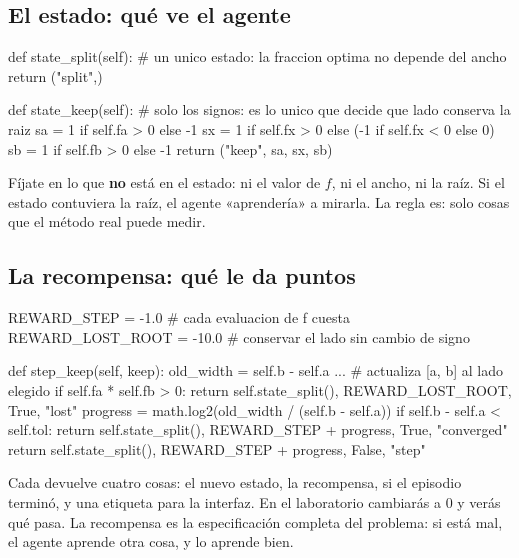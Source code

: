 \subsection*{El estado: qué ve el agente}
\begin{python}
def state_split(self):
    # un unico estado: la fraccion optima no depende del ancho
    return ("split",)

def state_keep(self):
    # solo los signos: es lo unico que decide que lado conserva la raiz
    sa = 1 if self.fa > 0 else -1
    sx = 1 if self.fx > 0 else (-1 if self.fx < 0 else 0)
    sb = 1 if self.fb > 0 else -1
    return ("keep", sa, sx, sb)
\end{python}
Fíjate en lo que \textbf{no} está en el estado: ni el valor de $f$, ni el ancho, ni la raíz. Si el estado contuviera la raíz, el agente «aprendería» a mirarla. La regla es: solo cosas que el método real puede medir.

\subsection*{La recompensa: qué le da puntos}
\begin{python}
REWARD_STEP = -1.0        # cada evaluacion de f cuesta
REWARD_LOST_ROOT = -10.0  # conservar el lado sin cambio de signo

def step_keep(self, keep):
    old_width = self.b - self.a
    ...  # actualiza [a, b] al lado elegido
    if self.fa * self.fb > 0:
        return self.state_split(), REWARD_LOST_ROOT, True, "lost"
    progress = math.log2(old_width / (self.b - self.a))
    if self.b - self.a < self.tol:
        return self.state_split(), REWARD_STEP + progress, True, "converged"
    return self.state_split(), REWARD_STEP + progress, False, "step"
\end{python}
Cada  devuelve cuatro cosas: el nuevo estado, la recompensa, si el episodio terminó, y una etiqueta para la interfaz. En el laboratorio cambiarás  a 0 y verás qué pasa. La recompensa es la especificación completa del problema: si está mal, el agente aprende otra cosa, y lo aprende bien.

